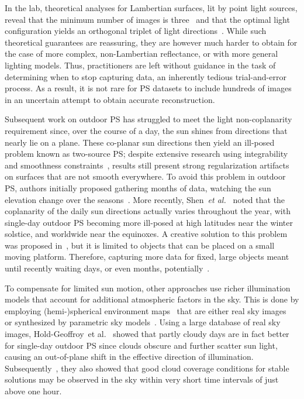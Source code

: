 In the lab, theoretical analyses for Lambertian surfaces, lit by point light sources, reveal that the minimum number of images is three~\cite{woodham-opteng-80} and that the optimal light configuration yields an orthogonal triplet of light directions~\cite{drbohlav-iccv-05}. While such theoretical guarantees are reassuring, they are however much harder to obtain for the case of more complex, non-Lambertian reflectance, or with more general lighting models. Thus, practitioners are left without guidance in the task of determining when to stop capturing data, an inherently tedious trial-and-error process. As a result, it is not rare for PS datasets to include hundreds of images~\cite{alldrin-cvpr-08} in an uncertain attempt to obtain accurate reconstruction. 

Subsequent work on outdoor PS has struggled to meet the light non-coplanarity requirement since, over the course of a day, the sun shines from directions that nearly lie on a plane. These co-planar sun directions then yield an ill-posed problem known as two-source PS; despite extensive research using integrability and smoothness constraints~\cite{onn-ijcv-90,hernandez-pami-11}, results still present strong regularization artifacts on surfaces that are not smooth everywhere. To avoid this problem in outdoor PS, authors initially proposed gathering months of data, watching the sun elevation change over the seasons~\cite{abrams-eccv-12,ackermann-cvpr-12}. More recently, Shen~{\em et al.}~\cite{shen-pg-14} noted that the coplanarity of the daily sun directions actually varies throughout the year, with single-day outdoor PS becoming more ill-posed at high latitudes near the winter solstice, and worldwide near the equinoxes. A creative solution to this problem was proposed in~\cite{hung-wacv-15}, but it is limited to objects that can be placed on a small moving platform. Therefore, capturing more data for fixed, large objects meant until recently waiting days, or even months, potentially~\cite{ackermann-cvpr-12,abrams-eccv-12}. 

To compensate for limited sun motion, other approaches use richer illumination models that account for additional atmospheric factors in the sky. This is done by employing \mbox{(hemi-)spherical} environment maps~\cite{debevec-siggraph-98} that are either real sky images~\cite{yu-iccp-13,shi-3dv-14,hung-wacv-15} or synthesized by parametric sky models~\cite{inose-tcva-13,jung-cvpr-15}. Using a large database of real sky images, Hold-Geoffroy~{et al.}~\cite{holdgeoffroy-iccp-15} showed that partly cloudy days are in fact better for single-day outdoor PS since clouds obscure and further scatter sun light, causing an out-of-plane shift in the effective direction of illumination. Subsequently~\cite{holdgeoffroy-3dv-15}, they also showed that good cloud coverage conditions for stable solutions may be observed in the sky within very short time intervals of just above one hour. 

